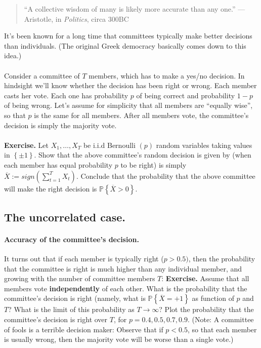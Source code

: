 \documentclass[11pt]{article}
\newcommand{\Prob}{\ensuremath{\mathbb{P}}}
\begin{document}
\begin{quote}
  ``A collective wisdom of many is likely more accurate than any one.'' —
Aristotle, in {\em Politics}, circa 300BC
\end{quote}
%
\noindent It's been known for a long time that committees typically make better decisions
than individuals. (The original Greek democracy basically comes down to this
idea.) 
\\~\\
Consider a committee of $T$ members, which has to make a yes/no decision. In
hindsight we'll know whether the decision has been right or wrong.
Each member casts her vote. Each one has probability $p$ of being correct and
probability $1-p$ of being wrong. Let's assume for simplicity that all members
are ``equally wise'', so that $p$ is the same for all members. After all members
vote, the committee's decision is simply the majority vote.
\\~\\
{\bf Exercise.} Let $X_1,\ldots, X_T$ be i.i.d Bernoulli $(p)$ random variables
taking values in $\left\{ \pm 1 \right\}$. Show that the 
above committee's random decision is given by  (when each member has equal
probability $p$ to be right) is simply 
$\overline{X}:= sign(\sum_{t=1}^T X_t)$. Conclude that the probability that the
above committee will make the right decision is $\Prob\left\{ \overline{X}>0
\right\}$.

\subsection{The uncorrelated case.}

\paragraph{Accuracy of the committee's decision.} 
It turns out that if each member is typically right ($p>0.5)$, 
then the probability that the committee is right is much higher than any
individual member, and growing with the number of committee members $T$:
%
{\bf Exercise.} Assume that all members vote {\bf independently} of each other.
What is the probability that the committee's decision is right (namely, what is
  $\Prob\left\{ \overline{X}=+1 \right\}$ as function of
$p$ and $T$? What is the limit of this probability as $T\to\infty$? Plot the
probability that the committee's decision is right over $T$, for $p=0.4,0.5,0.7,0.9$. 
(Note: A committee of fools is a terrible decision maker: Observe that if
  $p<0.5$, so that each member is usually wrong, then the majority vote
will be worse than a single vote.) 
\end{document}
